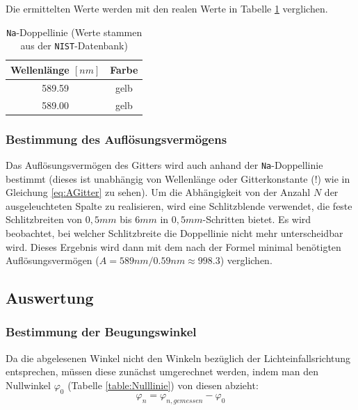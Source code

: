 \documentclass[a4paper, 11pt]{article}
\begin{document}
Die ermittelten Werte werden mit den realen Werte in Tabelle \ref{table:SpektrumNa} verglichen.

\begin{table}[H]
	\large
	\centering
	\begin{tabular}{|c|c|}
		\hline
		Wellenlänge $[nm]$ & Farbe \\
		\hline
		589.59 & gelb \\
		\hline
		589.00 & gelb \\
		\hline
	\end{tabular}
	\caption{\texttt{Na}-Doppellinie (Werte stammen aus der \texttt{NIST}-Datenbank)}
	\label{table:SpektrumNa}
\end{table}

\subsubsection{Bestimmung des Auflösungsvermögens}
Das Auflösungsvermögen des Gitters wird auch anhand der \texttt{Na}-Doppellinie bestimmt (dieses ist unabhängig von Wellenlänge oder Gitterkonstante (!) wie in Gleichung \ref{eq:AGitter} zu sehen).
Um die Abhängigkeit von der Anzahl $N$ der ausgeleuchteten Spalte zu realisieren, wird eine Schlitzblende verwendet, die feste Schlitzbreiten von $0,5mm$ bis $6mm$ in $0,5mm$-Schritten bietet. Es wird beobachtet, bei welcher Schlitzbreite die Doppellinie nicht mehr unterscheidbar wird. Dieses Ergebnis wird dann mit dem nach der Formel minimal benötigten Auflösungsvermögen ($A=589nm/0.59nm\approx998.3$) verglichen.



\clearpage
\subsection{Auswertung}
\subsubsection{Bestimmung der Beugungswinkel}\label{Bestimmung der Beugungswinkel}
Da die abgelesenen Winkel nicht den Winkeln bezüglich der Lichteinfallsrichtung entsprechen, müssen diese zunächst umgerechnet werden, indem man den Nullwinkel $\varphi_0$ (Tabelle \ref{table:Nulllinie}) von diesen abzieht:
\begin{equation}
\varphi_n = \varphi_{n, gemessen} - \varphi_0
\end{equation}
\end{document}
